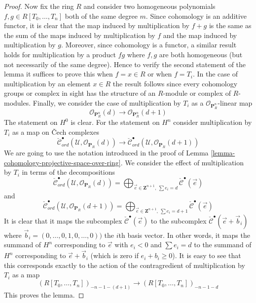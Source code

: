 \begin{proof}
\medskip\noindent
Now fix the ring $R$ and consider two homogeneous polynomials
$f, g \in R[T_0, \ldots, T_n]$ both of the same degree $m$.
Since cohomology is an additive functor, it is clear that the
map induced by multiplication by $f + g$ is the same as the sum
of the maps induced by multiplication by $f$ and the map induced
by multiplication by $g$. Moreover, since cohomology is a functor,
a similar result holds for multiplication by a product $fg$ where
$f, g$ are both homogeneous (but not necessarily of the same degree).
Hence to verify the second statement of the lemma it suffices to
prove this when $f = x \in R$ or when $f = T_i$.
In the case of multiplication by an element $x \in R$ the result
follows since every cohomology groups or complex in sight has the
structure of an $R$-module or complex of $R$-modules.
Finally, we consider the case of multiplication by $T_i$
as a $\mathcal{O}_{\mathbf{P}^n_R}$-linear map
$$
\mathcal{O}_{\mathbf{P}^n_R}(d)
\longrightarrow
\mathcal{O}_{\mathbf{P}^n_R}(d + 1)
$$
The statement on $H^0$ is clear. For the statement on $H^n$
consider multiplication by $T_i$ as a map on {\v C}ech complexes
$$
\check{\mathcal{C}}_{ord}^\bullet(\mathcal{U},
\mathcal{O}_{\mathbf{P}_R}(d))
\longrightarrow
\check{\mathcal{C}}_{ord}^\bullet(\mathcal{U},
\mathcal{O}_{\mathbf{P}_R}(d + 1))
$$
We are going to use the notation introduced in the proof of
Lemma \ref{lemma-cohomology-projective-space-over-ring}.
We consider the effect of multiplication by $T_i$
in terms of the decompositions
$$
\check{\mathcal{C}}_{ord}^\bullet(\mathcal{U}, \mathcal{O}_{\mathbf{P}_R}(d))
=
\bigoplus\nolimits_{\vec{e} \in \mathbf{Z}^{n + 1}, \ \sum e_i = d}
\check{\mathcal{C}}^\bullet(\vec{e})
$$
and
$$
\check{\mathcal{C}}_{ord}^\bullet(\mathcal{U},
\mathcal{O}_{\mathbf{P}_R}(d + 1))
=
\bigoplus\nolimits_{\vec{e} \in \mathbf{Z}^{n + 1}, \ \sum e_i = d + 1}
\check{\mathcal{C}}^\bullet(\vec{e})
$$
It is clear that it maps the subcomplex
$\check{\mathcal{C}}^\bullet(\vec{e})$ to the subcomplex
$\check{\mathcal{C}}^\bullet(\vec{e} + \vec{b}_i)$ where
$\vec{b}_i = (0, \ldots, 0, 1, 0, \ldots, 0))$ the $i$th basis vector.
In other words, it maps the summand of $H^n$ corresponding to
$\vec{e}$ with $e_i < 0$ and $\sum e_i = d$
to the summand of $H^n$ corresponding to
$\vec{e} + \vec{b}_i$ (which is zero if $e_i + b_i \geq 0$).
It is easy to see that this corresponds exactly to the action
of the contragredient of multiplication by $T_i$ as a map
$$
(R[T_0, \ldots, T_n])_{-n - 1 - (d + 1)}
\longrightarrow
(R[T_0, \ldots, T_n])_{-n - 1 - d}
$$
This proves the lemma.
\end{proof}

